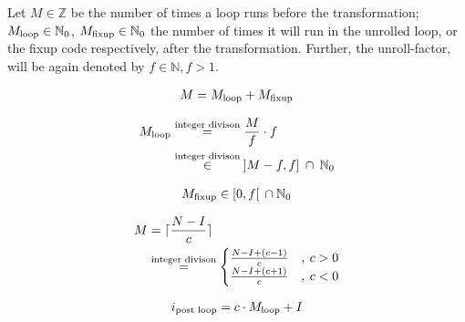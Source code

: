 Let $M \in \mathbb{Z}$ be the number of times a loop runs before the transformation; $M_{\text{loop}} \in \mathbb{N}_0$, $M_{\text{fixup}} \in \mathbb{N}_0$ the number of times it will run in the unrolled loop, or the fixup code respectively, after the transformation.
Further, the unroll-factor, will be again denoted by $f \in \mathbb{N}, f > 1$.

\begin{equation}\label{eqn:impl:fixup:duff:conserve-semantics-identity}
    \begin{aligned}
        M = M_{\text{loop}} + M_{\text{fixup}}
    \end{aligned}
\end{equation}

\begin{equation}\label{eqn:impl:fixup:duff:loop-iterations}
    \begin{aligned}
        M_{\text{loop}} &\overset{\text{integer divison}}{=} \frac{M}{f} \cdot f\\
        &\overset{\text{integer divison}}{\in} \medspace \rbrack M-f,f \rbrack \medspace \cap \medspace \mathbb{N}_0
    \end{aligned}
\end{equation}

\begin{equation}\label{eqn:impl:fixup:duff:fixup-interval}
    \begin{aligned}
        M_{\text{fixup}} \in \lbrack0, f\lbrack \medspace \medspace \cap \medspace \mathbb{N}_0
    \end{aligned}
\end{equation}

\begin{equation}\label{eqn:impl:fixup:duff:total-iteration-based-on-bounds}
    \begin{aligned}
        M &= \lceil{}\frac{N - I}{c}\rceil{} \\
        & \overset{\text{integer divison}}{=}
        \begin{cases}
              \frac{N - I + (c - 1)}{c} &, \medspace c > 0\\
              \frac{N - I + (c + 1)}{c} &, \medspace c < 0
        \end{cases}
    \end{aligned}
\end{equation}

\begin{equation}\label{eqn:impl:fixup:duff:i-after-loop}
    \begin{aligned}
        i_\text{post loop} = c \cdot M_{\text{loop}} + I
    \end{aligned}
\end{equation}

